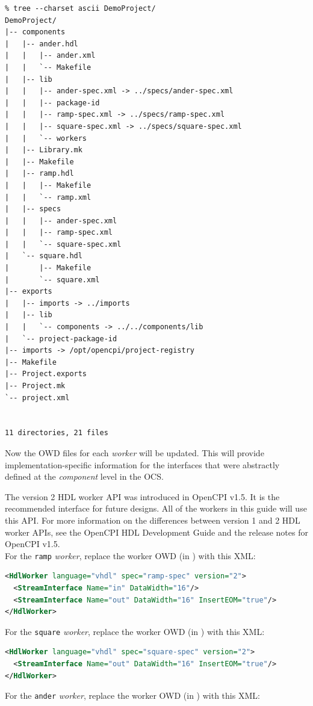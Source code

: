 \begin{verbatim}
% tree --charset ascii DemoProject/
DemoProject/
|-- components
|   |-- ander.hdl
|   |   |-- ander.xml
|   |   `-- Makefile
|   |-- lib
|   |   |-- ander-spec.xml -> ../specs/ander-spec.xml
|   |   |-- package-id
|   |   |-- ramp-spec.xml -> ../specs/ramp-spec.xml
|   |   |-- square-spec.xml -> ../specs/square-spec.xml
|   |   `-- workers
|   |-- Library.mk
|   |-- Makefile
|   |-- ramp.hdl
|   |   |-- Makefile
|   |   `-- ramp.xml
|   |-- specs
|   |   |-- ander-spec.xml
|   |   |-- ramp-spec.xml
|   |   `-- square-spec.xml
|   `-- square.hdl
|       |-- Makefile
|       `-- square.xml
|-- exports
|   |-- imports -> ../imports
|   |-- lib
|   |   `-- components -> ../../components/lib
|   `-- project-package-id
|-- imports -> /opt/opencpi/project-registry
|-- Makefile
|-- Project.exports
|-- Project.mk
`-- project.xml


11 directories, 21 files
\end{verbatim}
\bend

Now the OWD files for each \textit{worker} will be updated. This will provide implementation-specific information for the interfaces that were abstractly defined at the \textit{component} level in the OCS.\newline

The version 2 HDL worker API was introduced in OpenCPI v1.5. It is the recommended interface for future designs. All of the workers in this guide will use this API. For more information on the differences between version 1 and 2 HDL worker APIs, see the OpenCPI HDL Development Guide and the release notes for OpenCPI v1.5.\\
\bstart
For the \verb+ramp+ \textit{worker}, replace the worker OWD (in ) with this XML:

\begin{lstlisting}[language=xml]
<HdlWorker language="vhdl" spec="ramp-spec" version="2">
  <StreamInterface Name="in" DataWidth="16"/>
  <StreamInterface Name="out" DataWidth="16" InsertEOM="true"/>
</HdlWorker>
\end{lstlisting}
\bend

\bstart
For the \verb+square+ \textit{worker}, replace the worker OWD (in ) with this XML:

\begin{lstlisting}[language=xml]
<HdlWorker language="vhdl" spec="square-spec" version="2">
  <StreamInterface Name="out" DataWidth="16" InsertEOM="true"/>
</HdlWorker>
\end{lstlisting}
\bend
\bstart
For the \verb+ander+ \textit{worker}, replace the worker OWD (in ) with this XML:

